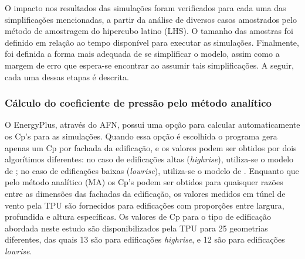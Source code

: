 \documentclass[brazil,hardcopy,openany,a5paper]{ufscthesis}
\begin{document}
		O impacto nos resultados das simulações foram verificados para cada uma das simplificações mencionadas, a partir da análise de diversos casos amostrados pelo método de amostragem do hipercubo latino (LHS). O tamanho das amostras foi definido em relação ao tempo disponível para executar as simulações.
		Finalmente, foi definida a forma mais adequada de se simplificar o modelo, assim como a margem de erro que espera-se encontrar ao assumir tais simplificações.
		A seguir, cada uma dessas etapas é descrita.
		
%		
%		
%		
		\subsubsection{Cálculo do coeficiente de pressão pelo método analítico}
		
		O EnergyPlus, através do AFN, possui uma opção para calcular automaticamente os Cp's para as simulações.
		Quando essa opção é escolhida o programa gera apenas um Cp por fachada da edificação, e os valores podem ser obtidos por dois algorítimos diferentes: no caso de edificações altas (\textit{highrise}), utiliza-se o modelo de  \cite{Atkins}; no caso de edificações baixas (\textit{lowrise}), utiliza-se o modelo de  \cite{SwamiChandra}.
		Enquanto que pelo método analítico (MA) os Cp's podem ser obtidos para quaisquer razões entre as dimensões das fachadas da edificação, os valores medidos em túnel de vento pela TPU são fornecidos para edificações com proporções entre largura, profundida e altura específicas.
		Os valores de Cp para o tipo de edificação abordada neste estudo são disponibilizados pela TPU para 25 geometrias diferentes, das quais 13 são para edificações \textit{highrise}, e 12 são para edificações \textit{lowrise}.
		
\end{document}
